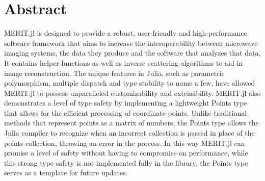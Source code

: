 \chapter*{Abstract}
MERIT.jl is designed to provide a robust, user-friendly and high-performance software framework that aims to increase
the interoperability between microwave imaging systems, the data they produce and the software that analyzes that data.
It contains helper functions as well as inverse scattering algorithms to aid in image reconstruction.
The unique features in Julia, such as parametric polymorphism, multiple dispatch and type stability to name a few, have
allowed MERIT.jl to possess unparalleled customizability and extensibility. MERIT.jl also demonstrates a level of type
safety by implementing a lightweight Points type that allows for the efficient processing of coordinate points. Unlike
traditional methods that represent points as a matrix of numbers, the Points type allows the Julia compiler to recognize
when an incorrect collection is passed in place of the points collection, throwing an error in the process. In this way
MERIT.jl can promise a level of safety without having to compromise on performance, while this strong type safety is not
implemented fully in the library, the Points type serves as a template for future updates.
\newpage
